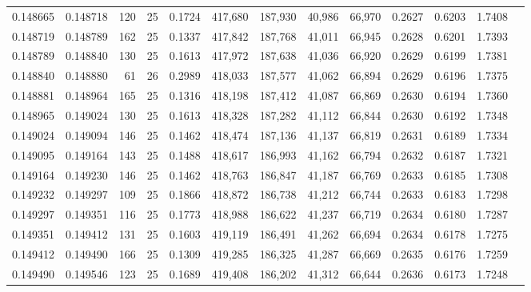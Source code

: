 \begin{tabular}{rrrrrrrrrrrrr}
0.148665 & 0.148718 &   120 &  25 &                                     0.1724 & 417,680 & 187,930 &  40,986 &  66,970 & 0.2627 & 0.6203 & 1.7408 \\
0.148719 & 0.148789 &   162 &  25 &                                     0.1337 & 417,842 & 187,768 &  41,011 &  66,945 & 0.2628 & 0.6201 & 1.7393 \\
0.148789 & 0.148840 &   130 &  25 &                                     0.1613 & 417,972 & 187,638 &  41,036 &  66,920 & 0.2629 & 0.6199 & 1.7381 \\
0.148840 & 0.148880 &    61 &  26 &                                     0.2989 & 418,033 & 187,577 &  41,062 &  66,894 & 0.2629 & 0.6196 & 1.7375 \\
0.148881 & 0.148964 &   165 &  25 &                                     0.1316 & 418,198 & 187,412 &  41,087 &  66,869 & 0.2630 & 0.6194 & 1.7360 \\
0.148965 & 0.149024 &   130 &  25 &                                     0.1613 & 418,328 & 187,282 &  41,112 &  66,844 & 0.2630 & 0.6192 & 1.7348 \\
0.149024 & 0.149094 &   146 &  25 &                                     0.1462 & 418,474 & 187,136 &  41,137 &  66,819 & 0.2631 & 0.6189 & 1.7334 \\
0.149095 & 0.149164 &   143 &  25 &                                     0.1488 & 418,617 & 186,993 &  41,162 &  66,794 & 0.2632 & 0.6187 & 1.7321 \\
0.149164 & 0.149230 &   146 &  25 &                                     0.1462 & 418,763 & 186,847 &  41,187 &  66,769 & 0.2633 & 0.6185 & 1.7308 \\
0.149232 & 0.149297 &   109 &  25 &                                     0.1866 & 418,872 & 186,738 &  41,212 &  66,744 & 0.2633 & 0.6183 & 1.7298 \\
0.149297 & 0.149351 &   116 &  25 &                                     0.1773 & 418,988 & 186,622 &  41,237 &  66,719 & 0.2634 & 0.6180 & 1.7287 \\
0.149351 & 0.149412 &   131 &  25 &                                     0.1603 & 419,119 & 186,491 &  41,262 &  66,694 & 0.2634 & 0.6178 & 1.7275 \\
0.149412 & 0.149490 &   166 &  25 &                                     0.1309 & 419,285 & 186,325 &  41,287 &  66,669 & 0.2635 & 0.6176 & 1.7259 \\
0.149490 & 0.149546 &   123 &  25 &                                     0.1689 & 419,408 & 186,202 &  41,312 &  66,644 & 0.2636 & 0.6173 & 1.7248 \\

\end{tabular}
